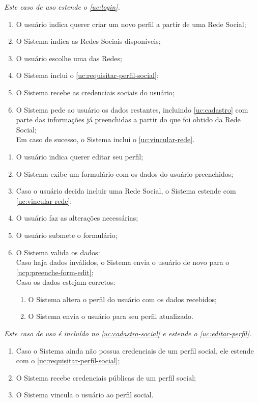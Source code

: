 \documentclass[12pt,a4paper,twoside,hyphens,english,brazil]{abntex2}
\begin{document}
{
\emph{Este caso de uso estende o \ref{uc:login}.}
\begin{enumerate}[itemsep=-1ex,topsep=-1ex]
	\item O usuário indica querer criar um novo perfil a partir de uma Rede Social;
	\item O Sistema indica as Redes Sociais disponíveis;
	\item O usuário escolhe uma das Redes;
	\item O Sistema inclui o \ref{uc:requisitar-perfil-social};
	\item O Sistema recebe as credenciais sociais do usuário;
	\item O Sistema pede ao usuário os dados restantes, incluindo \ref{uc:cadastro} com parte das informações já preenchidas a partir do que foi obtido da Rede Social;
		\\Em caso de sucesso, o Sistema inclui o \ref{uc:vincular-rede}.
\end{enumerate}

\begin{enumerate}[itemsep=-1ex]
	\item O usuário indica querer editar seu perfil;
	\item O Sistema exibe um formulário com os dados do usuário preenchidos; \label{ucp:preenche-form-edit}
	\item Caso o usuário decida incluir uma Rede Social, o Sistema estende com \ref{uc:vincular-rede};
	\item O usuário faz as alterações necessárias;
	\item O usuário submete o formulário;
	\item O Sistema valida os dados:
		\\Caso haja dados inválidos, o Sistema envia o usuário de novo para o \autoref{ucp:preenche-form-edit};
		\\Caso os dados estejam corretos:
			\begin{enumerate}[itemsep=-1ex,topsep=-1ex]
				\item O Sistema altera o perfil do usuário com os dados recebidos;
				\item O Sistema envia o usuário para seu perfil atualizado.
			\end{enumerate}
\end{enumerate}

\emph{Este caso de uso é incluído no \ref{uc:cadastro-social} e estende o \ref{uc:editar-perfil}.}
\begin{enumerate}[itemsep=-1ex,topsep=-1ex]
	\item Caso o Sistema ainda não possua credenciais de um perfil social, ele estende com o \ref{uc:requisitar-perfil-social};
	\item O Sistema recebe credenciais públicas de um perfil social;
	\item O Sistema vincula o usuário ao perfil social.
\end{enumerate}

}
\end{document}
